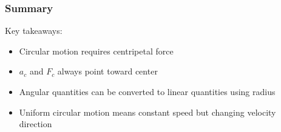 \documentclass{beamer}
\begin{document}
\begin{frame}
\frametitle{Summary}
Key takeaways:
\begin{itemize}
    \item Circular motion requires centripetal force
    \item $a_c$ and $F_c$ always point toward center
    \item Angular quantities can be converted to linear quantities using radius
    \item Uniform circular motion means constant speed but changing velocity direction
\end{itemize}
\end{frame}
\end{document}
